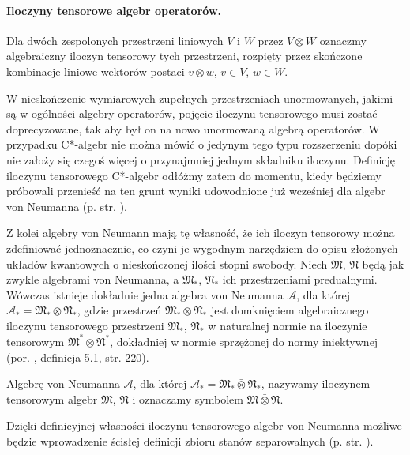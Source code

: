 \paragraph{Iloczyny tensorowe algebr operatorów.}
Dla dwóch zespolonych przestrzeni liniowych $V$ i $W$ przez
$V \! \otimes \! W$ oznaczmy algebraiczny iloczyn tensorowy tych przestrzeni,
rozpięty przez skończone kombinacje liniowe wektorów postaci
$v \otimes w$, $v \in V$, $w \in W$.

W nieskończenie wymiarowych zupełnych przestrzeniach unormowanych,
jakimi są w ogólności algebry operatorów,
pojęcie iloczynu tensorowego musi zostać doprecyzowane, tak aby
był on na nowo unormowaną algebrą operatorów.
W przypadku C*-algebr nie można mówić o jedynym tego typu rozszerzeniu
dopóki nie założy się czegoś więcej o przynajmniej jednym składniku iloczynu.
Definicję iloczynu tensorowego C*-algebr odłóżmy zatem do momentu,
kiedy będziemy próbowali przenieść na ten grunt wyniki udowodnione już
wcześniej dla algebr von Neumanna (p. str. \pageref{sec:HorCstar}).

Z kolei algebry von Neumann mają tę własność, że ich iloczyn
tensorowy można zdefiniować jednoznacznie,
co czyni je wygodnym narzędziem do opisu złożonych układów kwantowych
o nieskończonej ilości stopni swobody.
Niech $\mathfrak{M}$, $\mathfrak{N}$ będą jak zwykle algebrami von Neumanna,
a $\mathfrak{M}_{*}$, $\mathfrak{N}_{*}$ ich przestrzeniami predualnymi.
Wówczas istnieje dokładnie jedna algebra von Neumanna $\mathcal{A}$,
dla której
$\mathcal{A}_{*} = \mathfrak{M}_{*} \bar{\otimes} \mathfrak{N}_{*}$,
gdzie przestrzeń
$\mathfrak{M}_{*} \bar{\otimes} \mathfrak{N}_{*}$ jest domknięciem
algebraicznego iloczynu tensorowego przestrzeni
$\mathfrak{M}_{*}$, $\mathfrak{N}_{*}$ w naturalnej normie na iloczynie
tensorowym $\mathfrak{M}^{*} \otimes \mathfrak{N}^{*}$,
dokładniej w normie sprzężonej do normy iniektywnej
(por. \cite{Takesaki1}, definicja 5.1, str. 220).

\begin{Definition}
 \label{def:TensorProductOfvN}
    Algebrę von Neumanna $\mathcal{A}$, dla której
    $\mathcal{A}_{*} = \mathfrak{M}_{*} \bar{\otimes} \mathfrak{N}_{*}$,
    nazywamy iloczynem tensorowym algebr $\mathfrak{M}$, $\mathfrak{N}$
    i oznaczamy symbolem
    $\mathfrak{M} \bar{\otimes} \mathfrak{N}$.
\end{Definition}

Dzięki definicyjnej własności iloczynu tensorowego algebr von Neumanna
możliwe będzie wprowadzenie ścisłej definicji zbioru stanów separowalnych
(p. str. \pageref{def:SeparableStates}).

